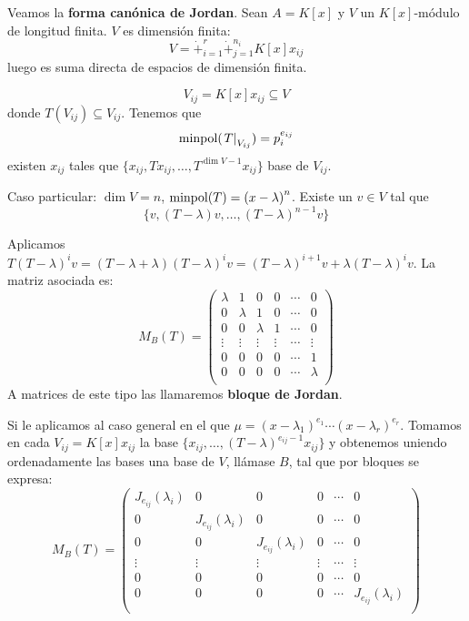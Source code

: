 \begin{ejemplo}
  Veamos la \textbf{forma canónica de Jordan}. Sean \(A = K[x]\) y \(V\) un
  \(K[x]\)-módulo de longitud finita.
  \(V\) es dimensión finita:
  \[
    V=\dot{+}_{i=1}^r\dot{+}_{j=1}^{n_i} K[x]x_{ij}
  \]
  luego es suma directa de espacios de dimensión finita.

  \[
    V_{ij}=K[x]x_{ij}\subseteq V
  \]
  donde \(T(V_{ij})\subseteq V_{ij}\). Tenemos que
  \[
    \operatorname{minpol}(\left.T\right|_{V_{ij}})=p_i^{e_{ij}}
  \]
  existen \(x_{ij}\) tales que \(\{x_{ij},Tx_{ij},\ldots,
  T^{\dim V -1}x_{ij}\}\) base de \(V_{ij}\).

  Caso particular: \(\dim V=n\), \(\operatorname{minpol}(T)={(x-\lambda)}^n\).
  Existe un \(v\in V\) tal que
  \[
    \{v, (T-\lambda)v,\ldots,{(T-\lambda)}^{n-1} v\}
  \]

  Aplicamos \(T{(T-\lambda)}^i v=(T-\lambda+\lambda){(T-\lambda)}^i v=
  {(T-\lambda)}^{i+1}v+\lambda{(T-\lambda)}^i v\).
  La matriz asociada es:
  \[
    M_B(T)=
    \begin{pmatrix}
      \lambda&1&0&0&\cdots&0\\
      0&\lambda&1&0&\cdots&0\\
      0&0&\lambda&1&\cdots&0\\
      \vdots&\vdots&\vdots&\vdots&\cdots&\vdots\\
      0&0&0&0&\cdots&1\\
      0&0&0&0&\cdots&\lambda\\
    \end{pmatrix}
  \]
  A matrices de este tipo las llamaremos \textbf{bloque de Jordan}.

  Si le aplicamos al caso general en el que
  \(\mu={(x-\lambda_1)}^{e_1}\cdots{(x-\lambda_r)}^{e_r}\). Tomamos en
  cada \(V_{ij} =K[x]x_{ij}\) la base \(\{x_{ij},\ldots,
  {(T-\lambda)}^{e_{ij}-1} x_{ij}\}\) y obtenemos uniendo ordenadamente las
  bases una base de \(V\), llámase \(B\), tal que por bloques se expresa:
  \[
    M_B(T)=
    \begin{pmatrix}
      J_{e_{ij}}(\lambda_i)&0&0&0&\cdots&0\\
      0&J_{e_{ij}}(\lambda_i)&0&0&\cdots&0\\
      0&0&J_{e_{ij}}(\lambda_i)&0&\cdots&0\\
      \vdots&\vdots&\vdots&\vdots&\cdots&\vdots\\
      0&0&0&0&\cdots&0\\
      0&0&0&0&\cdots&J_{e_{ij}}(\lambda_i)\\
    \end{pmatrix}
  \]
\end{ejemplo}